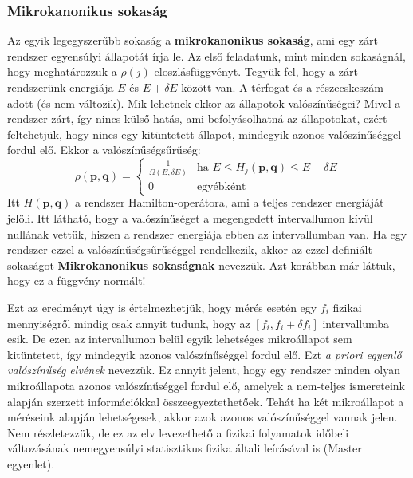 \documentclass[../main.tex]{subfiles}
\begin{document}
\subsubsection{Mikrokanonikus sokaság}
Az egyik legegyszerűbb sokaság a \textbf{mikrokanonikus sokaság}, ami egy zárt rendszer egyensúlyi állapotát írja le. Az első feladatunk, mint minden sokaságnál, hogy meghatározzuk a $\rho(j)$ eloszlásfüggvényt.
Tegyük fel, hogy a zárt rendszerünk energiája $E$ és $E + \delta E$ között van. A térfogat és a részecskeszám adott (és nem változik). Mik lehetnek ekkor az állapotok valószínűségei? Mivel a rendszer zárt,
így nincs külső hatás, ami befolyásolhatná az állapotokat, ezért feltehetjük, hogy nincs egy kitüntetett állapot, mindegyik azonos valószínűséggel fordul elő. Ekkor a valószínűségsűrűség:
\begin{equation}
    \boxed{\rho(\mathbf{p}, \mathbf{q}) = \begin{cases}
        \frac{1}{\Omega(E, \delta E)} & \text{ha } E \leq H_j(\mathbf{p}, \mathbf{q}) \leq E + \delta E \\
        0 & \text{egyébként}
    \end{cases}}
\end{equation}
Itt $H(\mathbf{p}, \mathbf{q})$ a rendszer Hamilton-operátora, ami a teljes rendszer energiáját jelöli. Itt látható, hogy a valószínűséget a megengedett intervallumon kívül nullának vettük, hiszen a rendszer energiája
ebben az intervallumban van. Ha egy rendszer ezzel a valószínűségsűrűséggel rendelkezik, akkor az ezzel definiált sokaságot \textbf{Mikrokanonikus sokaságnak} nevezzük. Azt korábban már láttuk, hogy ez a függvény normált!

Ezt az eredményt úgy is értelmezhetjük, hogy mérés esetén egy $f_i$ fizikai mennyiségről mindig csak annyit tudunk, hogy az $[f_i, f_i + \delta f_i]$ intervallumba esik.
De ezen az intervallumon belül egyik lehetséges mikroállapot sem kitüntetett, így mindegyik azonos valószínűséggel fordul elő. Ezt \textit{a priori egyenlő valószínűség elvének} nevezzük.
Ez annyit jelent, hogy egy rendszer minden olyan mikroállapota azonos valószínűséggel fordul elő, amelyek a nem-teljes ismereteink alapján szerzett információkkal összeegyeztethetőek. Tehát ha két mikroállapot 
a méréseink alapján lehetségesek, akkor azok azonos valószínűséggel vannak jelen. Nem részletezzük, de ez az elv levezethető a fizikai folyamatok időbeli változásának nemegyensúlyi statisztikus fizika általi leírásával is (Master egyenlet).
\end{document}
